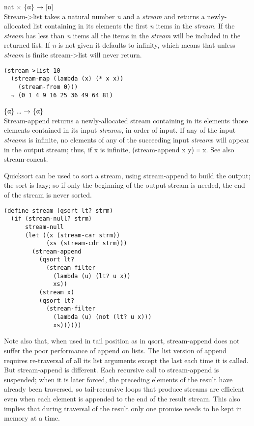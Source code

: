 \begin{entry}{%
  }

  nat × \{α\} → {[}α{]}\\
  Stream->list takes a natural number \emph{n} and a \emph{stream} and
  returns a newly-allocated list containing in its elements the first
  \emph{n} items in the \emph{stream}. If the \emph{stream} has less
  than \emph{n} items all the items in the \emph{stream} will be
  included in the returned list. If \emph{n} is not given it defaults
  to infinity, which means that unless \emph{stream} is finite
  stream->list will never return.

\begin{verbatim}
(stream->list 10
  (stream-map (lambda (x) (* x x))
    (stream-from 0)))
  ⇒ (0 1 4 9 16 25 36 49 64 81)
\end{verbatim}
\end{entry}

\begin{entry}{%
  }

  \{α\} \ldots{} → \{α\}\\
  Stream-append returns a newly-allocated stream containing in its
  elements those elements contained in its input \emph{stream}s, in
  order of input. If any of the input \emph{stream}s is infinite, no
  elements of any of the succeeding input \emph{stream}s will appear
  in the output stream; thus, if x is infinite, (stream-append x y) ≡
  x. See also stream-concat.

  Quicksort can be used to sort a stream, using stream-append to build
  the output; the sort is lazy; so if only the beginning of the output
  stream is needed, the end of the stream is never sorted.

\begin{verbatim}
(define-stream (qsort lt? strm)
  (if (stream-null? strm)
      stream-null
      (let ((x (stream-car strm))
            (xs (stream-cdr strm)))
        (stream-append
          (qsort lt?
            (stream-filter
              (lambda (u) (lt? u x))
              xs))
          (stream x)
          (qsort lt?
            (stream-filter
              (lambda (u) (not (lt? u x)))
              xs))))))
\end{verbatim}

  Note also that, when used in tail position as in qsort,
  stream-append does not suffer the poor performance of append on
  lists. The list version of append requires re-traversal of all its
  list arguments except the last each time it is called. But
  stream-append is different. Each recursive call to stream-append is
  suspended; when it is later forced, the preceding elements of the
  result have already been traversed, so tail-recursive loops that
  produce streams are efficient even when each element is appended to
  the end of the result stream. This also implies that during
  traversal of the result only one promise needs to be kept in memory
  at a time.
\end{entry}

